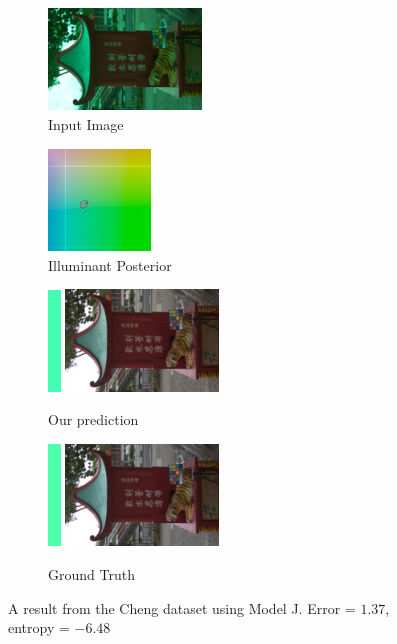 \documentclass[10pt,twocolumn,letterpaper]{article}
\begin{document}
\begin{figure}[!]
\centering
  \begin{subfigure}[!]{1.7in}
    \includegraphics[width=1.6in]{figures/results/cheng/00000049_input.jpg}
    \caption{\footnotesize Input Image}
  \end{subfigure}
  \begin{subfigure}[!]{1.17in}
    \includegraphics[width=1.07in]{figures/results/cheng/00000049_chroma.png}
    \caption{\footnotesize Illuminant Posterior}
  \end{subfigure}
\begin{subfigure}[!]{1.9in}
    \includegraphics[width=0.133in]{figures/results/cheng/00000049_illum.png}\!
    \includegraphics[width=1.6in]{figures/results/cheng/00000049_prediction.jpg}
    \caption{\footnotesize Our prediction}
  \end{subfigure}
  \begin{subfigure}[!]{1.9in}
    \includegraphics[width=0.133in]{figures/results/cheng/00000049_illum_true.png}\!
    \includegraphics[width=1.6in]{figures/results/cheng/00000049_true.jpg}
    \caption{\footnotesize Ground Truth}
  \end{subfigure}
  \caption{
    A result from the Cheng dataset using Model J. Error = $1.37$\textdegree, entropy = $-6.48$
    \label{fig:results13}
  }
\end{figure}
\end{document}

